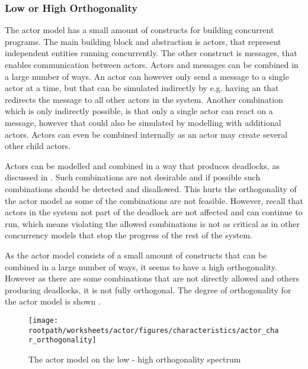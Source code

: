 \subsubsection{Low or High Orthogonality}\label{sec:actor_orthogonality}
The actor model has a small amount of constructs for building concurrent programs. The main building block and abstraction is actors, that represent independent entities running concurrently. The other construct is messages, that enables communication between actors. Actors and messages can be combined in a large number of ways. An actor can however only send a message to a single actor at a time, but that can be simulated indirectly by e.g. having an  that redirects the message to all other actors in the system. Another combination which is only indirectly possible, is that only a single actor can react on a message, however that could also be simulated by modelling with additional actors. Actors can even be combined internally as an actor may create several other child actors.

Actors can be modelled and combined in a way that produces deadlocks, as discussed in . Such combinations are not desirable and if possible such combinations should be detected and disallowed. This hurts the orthogonality of the actor model as some of the combinations are not feasible. However, recall that actors in the system not part of the deadlock are not affected and can continue to run, which means violating the allowed combinations is not as critical as in other concurrency models that stop the progress of the rest of the system.

As the actor model consists of a small amount of constructs that can be combined in a large number of ways, it seems to have a high orthogonality. However as there are some combinations that are not directly allowed and others producing deadlocks, it is not fully orthogonal. The degree of orthogonality for the actor model is shown .


\begin{figure}[htbp]
\centering
 \texttt{[image: \\rootpath/worksheets/actor/figures/characteristics/actor\_char\_orthogonality]} 
 \caption{The actor model on the low - high orthogonality spectrum}
\label{fig:actor_orthogonality}
\end{figure}

